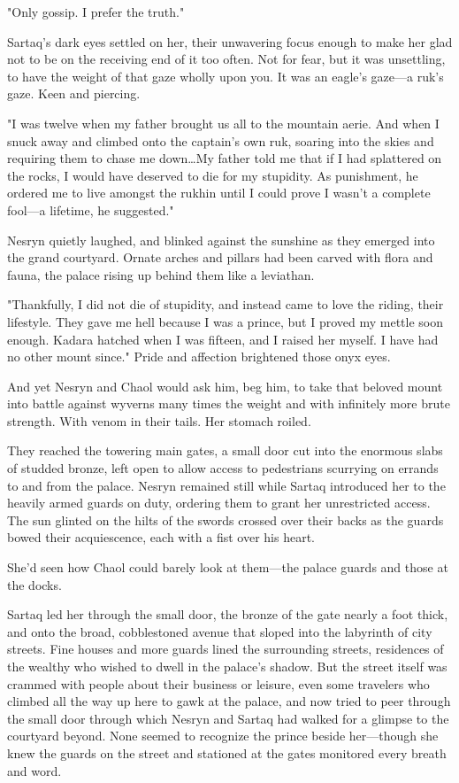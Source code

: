 "Only gossip. I prefer the truth."

Sartaq's dark eyes settled on her, their unwavering focus enough to make her glad not to be on the receiving end of it too often. Not for fear, but  it was unsettling, to have the weight of that gaze wholly upon you. It was an eagle's gaze---a ruk's gaze. Keen and piercing.

"I was twelve when my father brought us all to the mountain aerie. And when I snuck away and climbed onto the captain's own ruk, soaring into the skies and requiring them to chase me down\ldots My father told me that if I had splattered on the rocks, I would have deserved to die for my stupidity. As punishment, he ordered me to live amongst the rukhin until I could prove I wasn't a complete fool---a lifetime, he suggested."

Nesryn quietly laughed, and blinked against the sunshine as they emerged into the grand courtyard. Ornate arches and pillars had been carved with flora and fauna, the palace rising up behind them like a leviathan.

"Thankfully, I did not die of stupidity, and instead came to love the riding, their lifestyle. They gave me hell because I was a prince, but I proved my mettle soon enough. Kadara hatched when I was fifteen, and I raised her myself. I have had no other mount since." Pride and affection brightened those onyx eyes.

And yet Nesryn and Chaol would ask him, beg him, to take that beloved mount into battle against wyverns many times the weight and with infinitely more brute strength. With venom in their tails. Her stomach roiled.

They reached the towering main gates, a small door cut into the enormous slabs of studded bronze, left open to allow access to pedestrians scurrying on errands to and from the palace. Nesryn remained still while Sartaq introduced her to the heavily armed guards on duty, ordering them to grant her unrestricted access. The sun glinted on the hilts of the swords crossed over their backs as the guards bowed their acquiescence, each with a fist over his heart.

She'd seen how Chaol could barely look at them---the palace guards and those at the docks.

Sartaq led her through the small door, the bronze of the gate nearly a foot thick, and onto the broad, cobblestoned avenue that sloped into the labyrinth of city streets. Fine houses and more guards lined the surrounding streets, residences of the wealthy who wished to dwell in the palace's shadow. But the street itself was crammed with people about their business or leisure, even some travelers who climbed all the way up here to gawk at the palace, and now tried to peer through the small door through which Nesryn and Sartaq had walked for a glimpse to the courtyard beyond. None seemed to recognize the prince beside her---though she knew the guards on the street and stationed at the gates monitored every breath and word.

